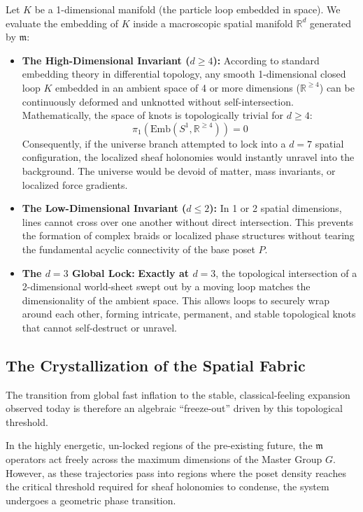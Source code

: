 \documentclass[12pt,letterpaper]{article}
\begin{document}
Let $K$ be a 1-dimensional manifold (the particle loop embedded in space). We evaluate the embedding of $K$ inside a macroscopic spatial manifold $\mathbb{R}^d$ generated by $\mathfrak{m}$:
\begin{itemize}
    \item \textbf{The High-Dimensional Invariant ($d \ge 4$):} According to standard embedding theory in differential topology, any smooth 1-dimensional closed loop $K$ embedded in an ambient space of 4 or more dimensions ($\mathbb{R}^{\ge 4}$) can be continuously deformed and unknotted without self-intersection. Mathematically, the space of knots is topologically trivial for $d \ge 4$:
    $$\pi_1(\text{Emb}(S^1, \mathbb{R}^{\ge 4})) = 0$$
    Consequently, if the universe branch attempted to lock into a $d=7$ spatial configuration, the localized sheaf holonomies would instantly unravel into the background. The universe would be devoid of matter, mass invariants, or localized force gradients.
    \item \textbf{The Low-Dimensional Invariant ($d \le 2$):} In 1 or 2 spatial dimensions, lines cannot cross over one another without direct intersection. This prevents the formation of complex braids or localized phase structures without tearing the fundamental acyclic connectivity of the base poset $P$.
    \item \textbf{The $d=3$ Global Lock:} \textbf{Exactly at $d=3$}, the topological intersection of a 2-dimensional world-sheet swept out by a moving loop matches the dimensionality of the ambient space. This allows loops to securely wrap around each other, forming intricate, permanent, and stable topological knots that cannot self-destruct or unravel.
\end{itemize}

\subsection{The Crystallization of the Spatial Fabric}
The transition from global fast inflation to the stable, classical-feeling expansion observed today is therefore an algebraic ``freeze-out'' driven by this topological threshold.

In the highly energetic, un-locked regions of the pre-existing future, the $\mathfrak{m}$ operators act freely across the maximum dimensions of the Master Group $G$. However, as these trajectories pass into regions where the poset density reaches the critical threshold required for sheaf holonomies to condense, the system undergoes a geometric phase transition.
\end{document}

